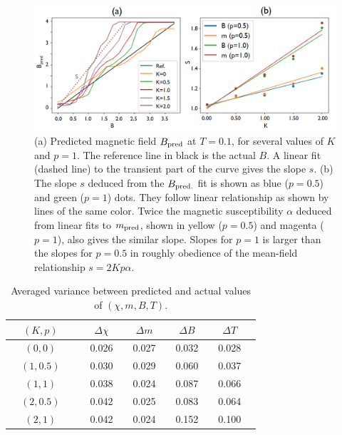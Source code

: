 \documentclass[reprint,amsmath,amssymb,aps,showpacs,superscriptaddress,prl]{revtex4-1}
\begin{document}
\begin{figure}[t]
\includegraphics[scale=0.36]{fig4.png}
\caption{(a) Predicted magnetic field $B_{\rm pred}$ at $T=0.1$, for several values of $K$ and $p=1$. The reference line in black is the actual $B$. A linear fit (dashed line) to the transient part of the curve gives the slope $s$. (b) The slope $s$ deduced from the $B_{\rm pred.}$ fit is shown as blue ($p=0.5$) and green ($p=1$) dots. They follow linear relationship as shown by lines of the same color. Twice the magnetic susceptibility $\alpha$ deduced from linear fits to $m_{\rm pred}$,  shown in yellow ($p=0.5$) and magenta ($p=1$), also gives the similar slope. Slopes for $p=1$ is larger than the slopes for $p=0.5$ in roughly obedience of the mean-field relationship $s = 2 K p \alpha$. } \label{fig:4}
\end{figure}

\begin{table}[htb]
\begin{tabular}{ | ccc || ccc  cc  cc  cc |}
\hline
 & $(K, p)$ & & & $\Delta\chi$ &  & $\Delta m$ &  & $\Delta B$ & & $\Delta T$ & \\ \hline
 & $(0,0)$  &  & & 0.026 & & 0.027 & & 0.032 & &  0.028 & \\ \hline
 & $(1,0.5)$ & & & 0.030 & & 0.029 & & 0.060 & & 0.037 & \\ \hline
 & $(1,1)$   & & & 0.038 & & 0.024 & & 0.087 & & 0.066 & \\ \hline
 & $(2, 0.5)$ & & & 0.042 & & 0.025 & & 0.083 & & 0.064 & \\ \hline
 & $(2,1)$ & & & 0.042 & & 0.024 & & 0.152 & & 0.100 & \\ \hline
\end{tabular}\label{tab:PBC}
\caption{Averaged variance between predicted and actual values of $(\chi, m, B, T)$.}
\end{table}
\end{document}
